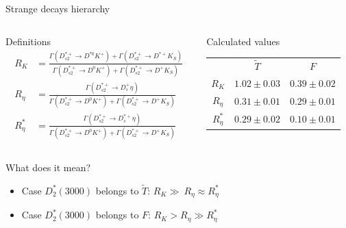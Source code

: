 \documentclass[professionalfonts,aspectratio=169]{beamer}
\begin{document}
\begin{frame}{Strange decays hierarchy}
  \begin{columns}
    \begin{column}[t]{0.5\textwidth}
      \begin{block}{Definitions}
        \vspace{0pt}
        \scriptsize
        \begin{align*}
          R_K &= \frac{\Gamma \left( D_{s 2}^{* +} \rightarrow D^{* 0} K^+ \right) + \Gamma \left( D_{s 2}^{* +} \rightarrow D^{* +} K_S \right)}{\Gamma \left( D_{s 2}^{* +} \rightarrow D^0 K^+ \right) + \Gamma \left( D_{s 2}^{* +} \rightarrow D^+ K_S \right)} \\
          R_\eta &= \frac{\Gamma \left( D_{s 2}^{* +} \rightarrow D_s^+ \eta \right)}{\Gamma \left( D_{s 2}^{* +} \rightarrow D^0 K^+ \right) + \Gamma \left( D_{s 2}^{* +} \rightarrow D^+ K_S \right)}  \\
          R^*_\eta &= \frac{\Gamma \left( D_{s 2}^{* +} \rightarrow D_s^{* +} \eta \right)}{\Gamma \left( D_{s 2}^{* +} \rightarrow D^0 K^+ \right) + \Gamma \left( D_{s 2}^{* +} \rightarrow D^+ K_S \right)} 
        \end{align*}
      \end{block}
    \end{column}
    \pause
    \begin{column}[t]{0.5\textwidth}
      \begin{block}{Calculated values}
        \vspace{0pt}
        \begin{table}
          \centering
          \begin{tabular}{*{3}{c}}
            \toprule
              & $\tilde{T}$ & $F$ \\
            \cmidrule{2-3}
            $R_K$ & $1.02 \pm 0.03$ & $0.39 \pm 0.02$ \\
            $R_\eta$ & $0.31 \pm 0.01$ & $0.29 \pm 0.01$ \\
            $R^*_\eta$ & $0.29 \pm 0.02$ & $0.10 \pm 0.01$ \\
            \bottomrule
          \end{tabular}
        \end{table}
      \end{block}
    \end{column}
  \end{columns}
  \pause
  \begin{block}{What does it mean?}
    \vspace{0pt}
    \begin{itemize}
      \item
        Case $D^*_2(3000)$ belongs to $\tilde{T}$: {} \alert{$R_K \gg \ R_\eta \approx R_\eta^*$}
      \item
        Case $D^*_2(3000)$ belongs to $F$: {} \alert{$R_K > R_\eta \gg R_\eta^*$}
    \end{itemize}
  \end{block}
\end{frame}
\end{document}
